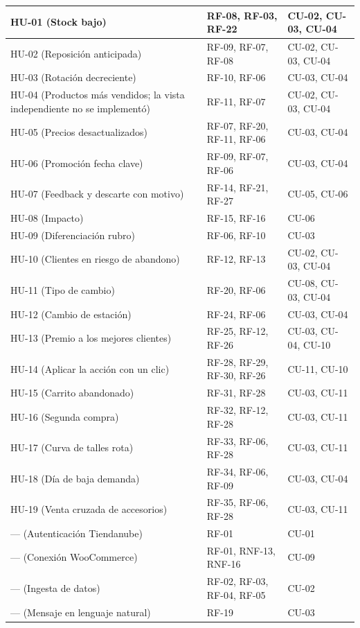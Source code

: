 \begin{longtable}{|m{5.3cm}|m{5.4cm}|m{4.3cm}|}
HU-01 (Stock bajo) & RF-08, RF-03, RF-22 & CU-02, CU-03, CU-04 \\
\hline
HU-02 (Reposición anticipada) & RF-09, RF-07, RF-08 & CU-02, CU-03, CU-04 \\
\hline
HU-03 (Rotación decreciente) & RF-10, RF-06 & CU-03, CU-04 \\
\hline
HU-04 (Productos más vendidos; la vista independiente no se implementó) & RF-11, RF-07 & CU-02, CU-03, CU-04 \\
\hline
HU-05 (Precios desactualizados) & RF-07, RF-20, RF-11, RF-06 & CU-03, CU-04 \\
\hline
HU-06 (Promoción fecha clave) & RF-09, RF-07, RF-06 & CU-03, CU-04 \\
\hline
HU-07 (Feedback y descarte con motivo) & RF-14, RF-21, RF-27 & CU-05, CU-06 \\
\hline
HU-08 (Impacto) & RF-15, RF-16 & CU-06 \\
\hline
HU-09 (Diferenciación rubro) & RF-06, RF-10 & CU-03 \\
\hline
HU-10 (Clientes en riesgo de abandono) & RF-12, RF-13 & CU-02, CU-03, CU-04 \\
\hline
HU-11 (Tipo de cambio) & RF-20, RF-06 & CU-08, CU-03, CU-04 \\
\hline
HU-12 (Cambio de estación) & RF-24, RF-06 & CU-03, CU-04 \\
\hline
HU-13 (Premio a los mejores clientes) & RF-25, RF-12, RF-26 & CU-03, CU-04, CU-10 \\
\hline
HU-14 (Aplicar la acción con un clic) & RF-28, RF-29, RF-30, RF-26 & CU-11, CU-10 \\
\hline
HU-15 (Carrito abandonado) & RF-31, RF-28 & CU-03, CU-11 \\
\hline
HU-16 (Segunda compra) & RF-32, RF-12, RF-28 & CU-03, CU-11 \\
\hline
HU-17 (Curva de talles rota) & RF-33, RF-06, RF-28 & CU-03, CU-11 \\
\hline
HU-18 (Día de baja demanda) & RF-34, RF-06, RF-09 & CU-03, CU-04 \\
\hline
HU-19 (Venta cruzada de accesorios) & RF-35, RF-06, RF-28 & CU-03, CU-11 \\
\hline
--- (Autenticación Tiendanube) & RF-01 & CU-01 \\
\hline
--- (Conexión WooCommerce) & RF-01, RNF-13, RNF-16 & CU-09 \\
\hline
--- (Ingesta de datos) & RF-02, RF-03, RF-04, RF-05 & CU-02 \\
\hline
--- (Mensaje en lenguaje natural) & RF-19 & CU-03 \\

\end{longtable}
